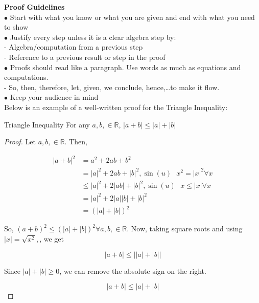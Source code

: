     \noindent \color{red} \textbf{Proof Guidelines} \color{black} \\
    $\bullet$ Start with what you know or what you are given and end with what you need to show \\
    $\bullet$ Justify every step unless it is a clear algebra step by: \\
    - Algebra/computation from a previous step \\
    - Reference to a previous result or step in the proof \\
    $\bullet$ Proofs should read like a paragraph. Use words as much as equations and computations. \\
    - So, then, therefore, let, given, we conclude, hence,\dots to make it flow. \\
    $\bullet$ Keep your audience in mind \\

    \noindent Below is an example of a well-written proof for the Triangle Inequality: \\

    \begin{tbhtheorem}{Triangle Inequality}
        For any $a,b,\in\mathbb{R}$, $|a+b| \leq |a| + |b|$
    \end{tbhtheorem}

    \begin{proof}
        \noindent Let $a,b,\in\mathbb{R}$. Then,

        \begin{align*}
            |a+b|^2     &= a^2 + 2ab + b^2 \\
            &= |a|^2 + 2ab + |b|^2, \sin(u)\text{ }x^2 = |x|^2 \forall x \\
            &\leq |a|^2 + 2|ab| + |b|^2, \sin(u)  \text{ } x\leq |x|\forall x \\
            &= |a|^2 + 2|a||b| + |b|^2 \\
            &= \left(|a| + |b| \right)^2
        \end{align*}

        \noindent So, $\left(a+b\right)^2\leq\left(|a|+|b|\right)^2\forall a,b,\in\mathbb{R}$. Now, taking square roots and using $|x| = \sqrt{x^2},$, we get

        \begin{equation*}
            |a+b|   \leq  \left||a| + |b|\right|
        \end{equation*}

        \noindent Since $|a|+|b|\geq 0$, we can remove the absolute sign on the right.

        \begin{equation*}
            |a+b|   \leq |a| + |b|
        \end{equation*}
    \end{proof}

